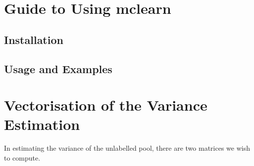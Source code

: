 
\appendix

\chapter{Guide to Using mclearn}
\label{cha:mclearn}

\section{Installation}
\label{sec:installation}

\section{Usage and Examples}
\label{sec:usage}


\chapter{Vectorisation of the Variance Estimation}
\label{cha:vectorise}

In estimating the variance of the unlabelled pool, there are two matrices we wish to compute.




